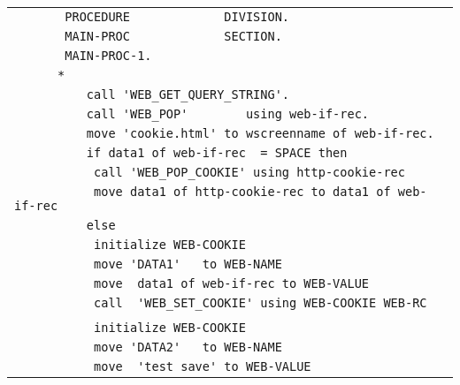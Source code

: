 {\begin{tabular}{|l|}
\vspace{-0.4em}\verb!       PROCEDURE             DIVISION.!\\
\vspace{-0.4em}\verb!       MAIN-PROC             SECTION.!\\
\vspace{-0.4em}\verb!       MAIN-PROC-1.!\\
\vspace{-0.4em}\verb!      *!\\
\vspace{-0.4em}\verb!          call 'WEB_GET_QUERY_STRING'.!\\
\vspace{-0.4em}\verb!          call 'WEB_POP'        using web-if-rec.!\\
\vspace{-0.4em}\verb!          move 'cookie.html' to wscreenname of web-if-rec.!\\
\vspace{-0.4em}\verb!          if data1 of web-if-rec  = SPACE then!\\
\vspace{-0.4em}\verb!           call 'WEB_POP_COOKIE' using http-cookie-rec!\\
\vspace{-0.4em}\verb!           move data1 of http-cookie-rec to data1 of web-if-rec!\\
\vspace{-0.4em}\verb!          else!\\
\vspace{-0.4em}\verb!           initialize WEB-COOKIE!\\
\vspace{-0.4em}\verb!           move 'DATA1'   to WEB-NAME!\\
\vspace{-0.4em}\verb!           move  data1 of web-if-rec to WEB-VALUE!\\
\vspace{-0.4em}\verb!           call  'WEB_SET_COOKIE' using WEB-COOKIE WEB-RC!\\
\vspace{-0.4em}\verb!!\\
\vspace{-0.4em}\verb!           initialize WEB-COOKIE!\\
\vspace{-0.4em}\verb!           move 'DATA2'   to WEB-NAME!\\
\vspace{-0.4em}\verb!           move  'test save' to WEB-VALUE!\\

\end{tabular}}
